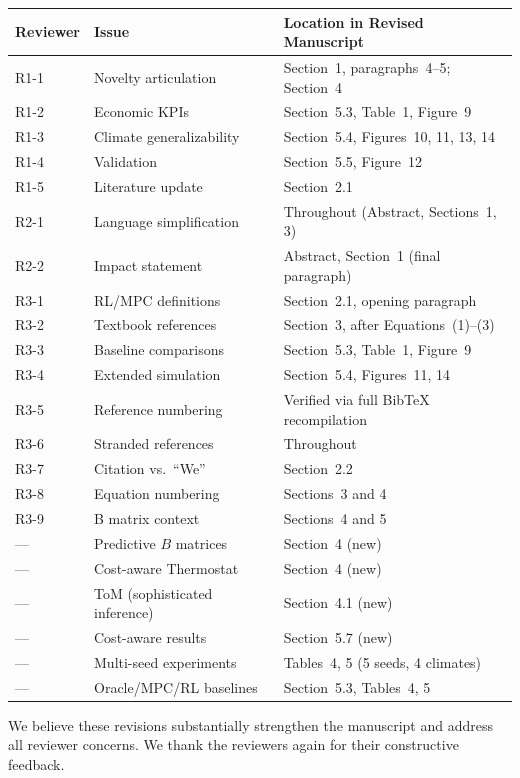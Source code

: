 \documentclass[11pt]{article}
\begin{document}
\begin{table}[h]
\centering
\begin{tabular}{lll}
\toprule
\textbf{Reviewer} & \textbf{Issue} & \textbf{Location in Revised Manuscript} \\
\midrule
R1-1 & Novelty articulation & Section~1, paragraphs~4--5; Section~4 \\
R1-2 & Economic KPIs & Section~5.3, Table~1, Figure~9 \\
R1-3 & Climate generalizability & Section~5.4, Figures~10, 11, 13, 14 \\
R1-4 & Validation & Section~5.5, Figure~12 \\
R1-5 & Literature update & Section~2.1 \\
R2-1 & Language simplification & Throughout (Abstract, Sections~1, 3) \\
R2-2 & Impact statement & Abstract, Section~1 (final paragraph) \\
R3-1 & RL/MPC definitions & Section~2.1, opening paragraph \\
R3-2 & Textbook references & Section~3, after Equations~(1)--(3) \\
R3-3 & Baseline comparisons & Section~5.3, Table~1, Figure~9 \\
R3-4 & Extended simulation & Section~5.4, Figures~11, 14 \\
R3-5 & Reference numbering & Verified via full BibTeX recompilation \\
R3-6 & Stranded references & Throughout \\
R3-7 & Citation vs.\ ``We'' & Section~2.2 \\
R3-8 & Equation numbering & Sections~3 and 4 \\
R3-9 & B matrix context & Sections~4 and 5 \\
--- & Predictive $B$ matrices & Section~4 (new) \\
--- & Cost-aware Thermostat & Section~4 (new) \\
--- & ToM (sophisticated inference) & Section~4.1 (new) \\
--- & Cost-aware results & Section~5.7 (new) \\
--- & Multi-seed experiments & Tables~4, 5 (5 seeds, 4 climates) \\
--- & Oracle/MPC/RL baselines & Section~5.3, Tables~4, 5 \\
\bottomrule
\end{tabular}
\end{table}

\vspace{1em}
We believe these revisions substantially strengthen the manuscript and address all reviewer concerns. We thank the reviewers again for their constructive feedback.
\end{document}
